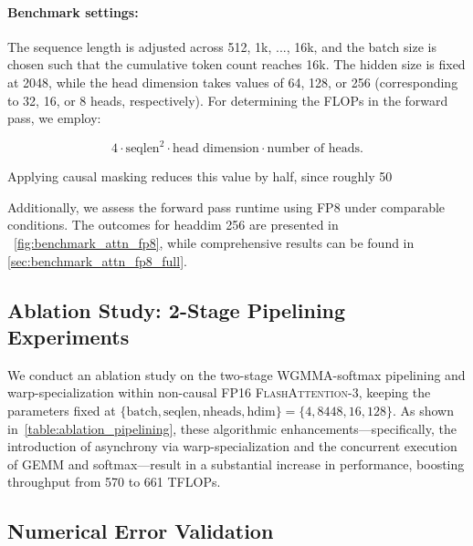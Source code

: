 \begin{itemize}
\paragraph{Benchmark settings:} The sequence length is adjusted across 512, 1k, ..., 16k, and the batch size is chosen such that the cumulative token count reaches 16k. The hidden size is fixed at 2048, while the head dimension takes values of 64, 128, or 256 (corresponding to 32, 16, or 8 heads, respectively). For determining the FLOPs in the forward pass, we employ:

\begin{equation*}
  4 \cdot \text{seqlen}^2 \cdot \text{head dimension} \cdot \text{number of heads}.
\end{equation*}

Applying causal masking reduces this value by half, since roughly 50%

Additionally, we assess the forward pass runtime using FP8 under comparable conditions. The outcomes for headdim 256 are presented in ~\cref{fig:benchmark_attn_fp8}, while comprehensive results can be found in \cref{sec:benchmark_attn_fp8_full}.

\subsection{Ablation Study: 2-Stage Pipelining Experiments}
\label{sec:2-stage-pipelining-experiments}

We conduct an ablation study on the two-stage WGMMA-softmax pipelining and warp-specialization within non-causal FP16 \textsc{FlashAttention-3}, keeping the parameters fixed at $\{\text{batch}, \text{seqlen}, \text{nheads}, \text{hdim}\} = \{ 4, 8448, 16, 128\}$. As shown in~\cref{table:ablation_pipelining}, these algorithmic enhancements—specifically, the introduction of asynchrony via warp-specialization and the concurrent execution of GEMM and softmax—result in a substantial increase in performance, boosting throughput from 570 to 661 TFLOPs.

\subsection{Numerical Error Validation}
\label{sec:numerical_error}


\end{itemize}

